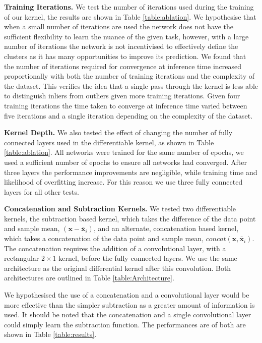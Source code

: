 \documentclass[letterpaper, 11pt]{IEEEtran}
\begin{document}
\noindent\textbf{Training Iterations.}
We test the number of iterations used during the training of our kernel, the results are shown in Table \ref{table:ablation}.
We hypothesise that when a small number of iterations are used the network does not have the sufficient flexibility to learn the nuance of the given task, however, with a large number of iterations the network is not incentivised to effectively define the clusters as it has many opportunities to improve its prediction. We found that the number of iterations required for convergence at inference time increased proportionally with both the number of training iterations and the complexity of the dataset. This verifies the idea that a single pass through the kernel is less able to distinguish inliers from outliers given more training iterations.
Given four training iterations the time taken to converge at inference time varied between five iterations and a single iteration depending on the complexity of the dataset.


\noindent\textbf{Kernel Depth.} We also tested the effect of changing the number of fully connected layers used in the differentiable kernel, as shown in Table \ref{table:ablation}.
All networks were trained for the same number of epochs, we used a sufficient number of epochs to ensure all networks had converged. 
After three layers the performance improvements are negligible, while training time and likelihood of overfitting increase. For this reason we use three fully connected layers for all other tests.

\noindent\textbf{Concatenation and Subtraction Kernels.}
We tested two differentiable kernels, the subtraction based kernel,
which takes the difference of the data point and sample mean, $(\mathbf{x} - \bar{\mathbf{x}}_i)$, and an alternate, concatenation based kernel,
which takes a 
concatenation of the data point and sample mean, $concat(\mathbf{x}, \bar{\mathbf{x}}_i)$.
The concatenation requires the addition of a convolutional layer, with a rectangular $ 2 \times 1$ kernel, before the fully connected layers. We use the same architecture as the original differential kernel after this convolution. 
Both architectures are outlined in Table \ref{table:Architecture}.

We hypothesised the use of a concatenation and a convolutional layer would be more effective than the simpler subtraction as a greater amount of information is used. It should be noted that the concatenation and a single convolutional layer could simply learn the subtraction function. The performances are of both are shown in Table \ref{table:results}.
\end{document}
